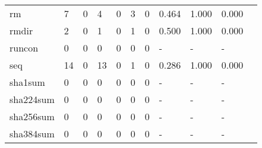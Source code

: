 \begin{longtable}{lp{1.10cm}p{1.10cm}p{1.10cm}p{1.10cm}p{1.10cm}p{1.10cm}p{1.10cm}p{1.10cm}p{1.10cm}p{1.10cm}}
rm        &                      7 &                                  0 &                                 4 &                                0 &                                 3 &                               0 &                          0.464 &                                 1.000 &                               0.000 \\
rmdir     &                      2 &                                  0 &                                 1 &                                0 &                                 1 &                               0 &                          0.500 &                                 1.000 &                               0.000 \\
runcon    &                      0 &                                  0 &                                 0 &                                0 &                                 0 &                               0 &                              - &                                     - &                                   - \\
seq       &                     14 &                                  0 &                                13 &                                0 &                                 1 &                               0 &                          0.286 &                                 1.000 &                               0.000 \\
sha1sum   &                      0 &                                  0 &                                 0 &                                0 &                                 0 &                               0 &                              - &                                     - &                                   - \\
sha224sum &                      0 &                                  0 &                                 0 &                                0 &                                 0 &                               0 &                              - &                                     - &                                   - \\
sha256sum &                      0 &                                  0 &                                 0 &                                0 &                                 0 &                               0 &                              - &                                     - &                                   - \\
sha384sum &                      0 &                                  0 &                                 0 &                                0 &                                 0 &                               0 &                              - &                                     - &                                   - \\

\end{longtable}
